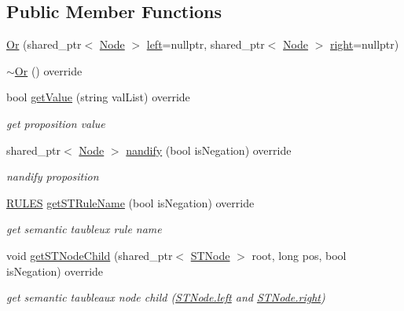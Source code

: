 \subsection*{Public Member Functions}
\begin{DoxyCompactItemize}
\item 
\hyperlink{class_or_a3247e4bae89e48da60037469ba896128}{Or} (shared\+\_\+ptr$<$ \hyperlink{class_node}{Node} $>$ \hyperlink{class_node_a978574f2c08939cfef1041041eb9c5be}{left}=nullptr, shared\+\_\+ptr$<$ \hyperlink{class_node}{Node} $>$ \hyperlink{class_node_af68a851484bce64ed9463a50025df424}{right}=nullptr)
\item 
\hyperlink{class_or_aea3ecd177d77f4478464d2def9c5618b}{$\sim$\+Or} () override
\item 
bool \hyperlink{class_or_a9ede00ef8120ad4aee9f69049628ead9}{get\+Value} (string val\+List) override
\begin{DoxyCompactList}\small\item\em get proposition value \end{DoxyCompactList}\item 
shared\+\_\+ptr$<$ \hyperlink{class_node}{Node} $>$ \hyperlink{class_or_a1fc17643b67383ec7be340d278c8e60a}{nandify} (bool is\+Negation) override
\begin{DoxyCompactList}\small\item\em nandify proposition \end{DoxyCompactList}\item 
\hyperlink{proposition_2tableaux_2enum_8h_a70c93904c6a27d228050f922eb4fc3b8}{R\+U\+L\+ES} \hyperlink{class_or_a0fd1f6086987f7b1fe9fab9a196c1839}{get\+S\+T\+Rule\+Name} (bool is\+Negation) override
\begin{DoxyCompactList}\small\item\em get semantic taubleux rule name \end{DoxyCompactList}\item 
void \hyperlink{class_or_aeedae2f08d30d4e9dcae30916aa27c59}{get\+S\+T\+Node\+Child} (shared\+\_\+ptr$<$ \hyperlink{class_s_t_node}{S\+T\+Node} $>$ root, long pos, bool is\+Negation) override
\begin{DoxyCompactList}\small\item\em get semantic taubleaux node child (\hyperlink{class_s_t_node_a19ba8bab4660bdeee0e897687b451a8b}{S\+T\+Node.\+left} and \hyperlink{class_s_t_node_a66d06118063fb739058f91c75b725e27}{S\+T\+Node.\+right}) \end{DoxyCompactList}\item 

\end{DoxyCompactItemize}
